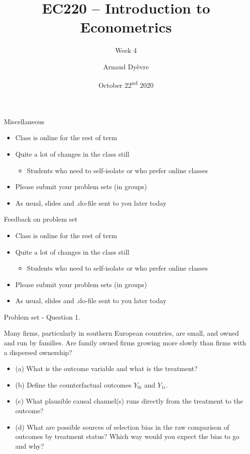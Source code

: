 \documentclass[aspectratio=169, 11pt]{beamer}
\title[]{EC220 -- Introduction to Econometrics} %
\subtitle{Week 4}
\author{Arnaud Dy\`evre} %
\institute[] %
{
}
\date{October 22\textsuperscript{nd} 2020} %
\begin{document}
\begin{frame}
\titlepage %
\end{frame}




\begin{frame}{Miscellaneous}

\begin{itemize}[<+- | alert@+>]
    \item Class is online for the rest of  term 
    \item Quite a lot of changes in the class still
    \begin{itemize}
        \item Students who need to self-isolate or who prefer online classes
    \end{itemize}
    \item Please submit your problem sets (in groups)
    \item As usual, slides and .do-file sent to you later today
\end{itemize}

\end{frame}

\begin{frame}{Feedback on problem set}

\begin{itemize}[<+- | alert@+>]
    \item Class is online for the rest of  term 
    \item Quite a lot of changes in the class still
    \begin{itemize}
        \item Students who need to self-isolate or who prefer online classes
    \end{itemize}
    \item Please submit your problem sets (in groups)
    \item As usual, slides and .do-file sent to you later today
\end{itemize}

\end{frame}

\begin{frame}{Problem set - Question 1.}

Many firms, particularly in southern European countries, are small, and owned and run by families. 
Are family owned firms growing more slowly than firms with a dispersed ownership?

\begin{itemize}
    \item (a) What is the outcome variable and what is the treatment?
    \item (b) Define the counterfactual outcomes $Y_{0i}$ and $Y_{1i}$.
    \item (c) What plausible causal channel(s) runs directly from the treatment to the outcome?
    \item (d) What are possible sources of selection bias in the raw comparison of outcomes by treatment status? Which way would you expect the bias to go and why?
\end{itemize}

\end{frame}
\end{document}

